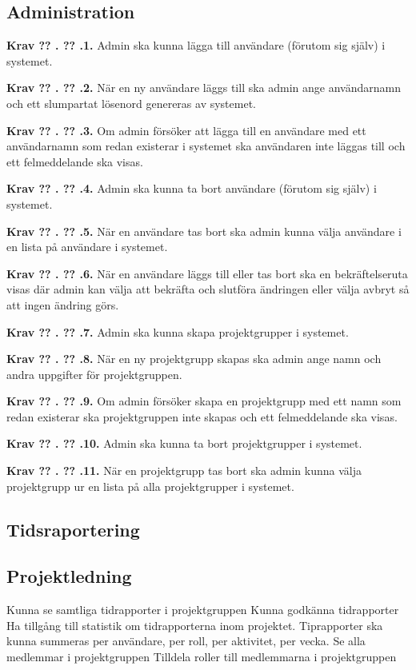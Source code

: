 \documentclass[a4paper]{article}
\newcommand\getcurrentref[1]{%
 \ifnumequal{\value{#1}}{0}
  {??}
  {\the\value{#1}}%
}
\newcommand\requirement[2]{
	\numberedrow{Krav}{#1}{#2}
}
\newcommand\numberedrow[3]{
	\noindent
	\textbf{#1 \getcurrentref{section}.\getcurrentref{subsection}.#2.} #3
	
}
\begin{document}
\subsection{Administration}
\requirement{1}{Admin ska kunna lägga till användare (förutom sig själv) i systemet.}

\requirement{2}{När en ny användare läggs till ska admin ange användarnamn och ett slumpartat lösenord genereras av systemet.}

\requirement{3}{Om admin försöker att lägga till en användare med ett användarnamn som redan existerar i systemet ska användaren inte läggas till och ett felmeddelande ska visas.}

\requirement{4}{Admin ska kunna ta bort användare (förutom sig själv) i systemet.}

\requirement{5}{När en användare tas bort ska admin kunna välja användare i en lista på användare i systemet.}

\requirement{6}{När en användare läggs till eller tas bort ska en bekräftelseruta visas där admin kan välja att bekräfta och slutföra ändringen eller välja avbryt så att ingen ändring görs.}

\requirement{7}{Admin ska kunna skapa projektgrupper i systemet.}

\requirement{8}{När en ny projektgrupp skapas ska admin ange namn och andra uppgifter för projektgruppen.}

\requirement{9}{Om admin försöker skapa en projektgrupp med ett namn som redan existerar ska projektgruppen inte skapas och ett felmeddelande ska visas.}

\requirement{10}{Admin ska kunna ta bort projektgrupper i systemet.}

\requirement{11}{När en projektgrupp tas bort ska admin kunna välja projektgrupp ur en lista på alla projektgrupper i systemet.}


\subsection{Tidsraportering}
\subsection{Projektledning}
Kunna se samtliga tidrapporter i projektgruppen
Kunna godkänna tidrapporter
Ha tillgång till statistik om tidrapporterna inom projektet. Tiprapporter ska kunna summeras per användare, per roll, per aktivitet, per vecka.
Se alla medlemmar i projektgruppen
Tilldela roller till medlemmarna i projektgruppen
\end{document}
